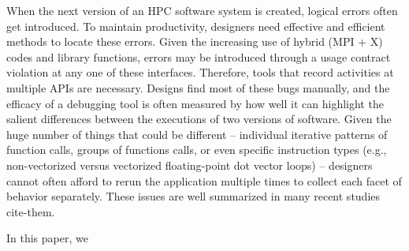 When the next version of an HPC software system is created, logical errors often
get introduced.
%
To maintain productivity, designers need effective and efficient methods to locate
these errors.
%
Given the increasing use of hybrid (MPI + X) codes and library functions, errors may
be introduced through a usage contract violation at any one of these interfaces.
%
Therefore, tools that record activities at multiple APIs are necessary.
%
Designs find most of these bugs manually, and the efficacy of a debugging tool is
often measured by how well it can highlight the salient differences between the
executions of two versions of software.
%
Given the huge number of things that could be different -- individual iterative
patterns of function calls, groups of functions calls, or even specific instruction
types (e.g., non-vectorized versus vectorized floating-point dot vector loops) -- designers
cannot often afford to rerun the application multiple times to collect each facet
of behavior separately.
%
These issues are well summarized in many recent studies cite-them.


In this paper, we 

